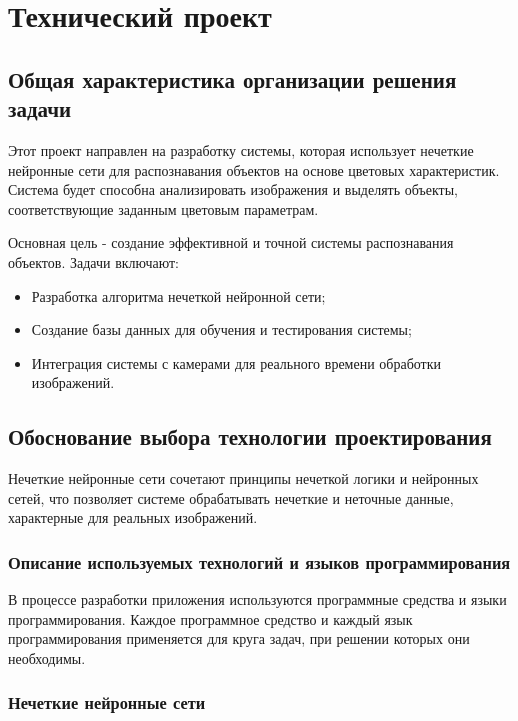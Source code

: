 \section{Технический проект}
\subsection{Общая характеристика организации решения задачи}

Этот проект направлен на разработку системы, которая использует нечеткие нейронные сети для распознавания объектов на основе цветовых характеристик. Система будет способна анализировать изображения и выделять объекты, соответствующие заданным цветовым параметрам.

Основная цель - создание эффективной и точной системы распознавания объектов. Задачи включают:

\begin{itemize}
\item Разработка алгоритма нечеткой нейронной сети;
\item Создание базы данных для обучения и тестирования системы;
\item Интеграция системы с камерами для реального времени обработки изображений.
\end{itemize}

\subsection{Обоснование выбора технологии проектирования}

Нечеткие нейронные сети сочетают принципы нечеткой логики и нейронных сетей, что позволяет системе обрабатывать нечеткие и неточные данные, характерные для реальных изображений.

\subsubsection{Описание используемых технологий и языков программирования}

В процессе разработки приложения используются программные средства и языки программирования. Каждое программное средство и каждый язык программирования применяется для круга задач, при решении которых они необходимы.

\subsubsection{Нечеткие нейронные сети}

